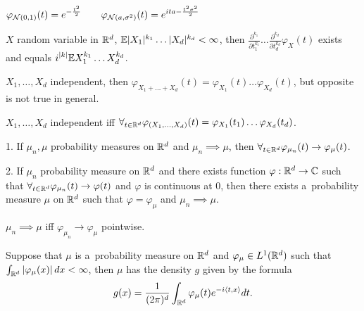 



	\begin{theorem}
		$\displaystyle \varphi_{\mathcal{N}(0,1)}(t) = e^{-\frac{t^2}{2}} \qquad \varphi_{\mathcal{N}(a,\sigma^2)}(t) = e^{ita - \frac{t^2 \sigma^2}{2}}$
	\end{theorem}
	
	\begin{theorem}
		$X$ random variable in $\mathbb{R}^d$, $\mathbb{E} |X_1|^{k_1} \ldots |X_d|^{k_d} < \infty$, then $\displaystyle \frac{\partial^{k_1}}{\partial t_1^{k_1}} \ldots \frac{\partial^{k_d}}{\partial t_d^{k_d}} \varphi_X(t)$ exists and equals $\displaystyle i^{|k|} \mathbb{E} X_1^{k_1} \ldots X_d^{k_d}$.
	\end{theorem}
	
	\begin{remark}
		$X_1, \ldots, X_d$ independent, then $\varphi_{X_1 + \ldots + X_d}(t) = \varphi_{X_1}(t) \ldots \varphi_{X_d}(t)$, but opposite is not true in general.
	\end{remark}
	
	\begin{theorem}
		$X_1, \ldots, X_d$ independent iff $\forall_{t \in \mathbb{R}^d} \varphi_{(X_1, \ldots, X_d)}(t) = \varphi_{X_1}(t_1) \ldots \varphi_{X_d}(t_d)$.
	\end{theorem}
	
	\begin{theorem}[L\'{e}vy-Cramer]
		1. If $\mu_n, \mu$ probability measures on $\mathbb{R}^d$ and $\mu_n \implies \mu$, then $\displaystyle\forall_{t \in \mathbb{R}^d} \varphi_{\mu_n}(t) \to \varphi_\mu(t)$.
		
		2. If $\mu_n$ probability measure on $\mathbb{R}^d$ and there exists function $\varphi:\mathbb{R}^d \to {\mathbb{C}}$ such that $\forall_{t \in \mathbb{R}^d} \varphi_{\mu_n}(t) \to \varphi(t)$ and $\varphi$ is continuous at 0, then there exists a~probability measure $\mu$ on $\mathbb{R}^d$ such that $\varphi=\varphi_\mu$ and $\mu_n \implies \mu$.
	\end{theorem}
	
	\begin{corollary}
		$\mu_n \implies \mu$ iff $\varphi_{\mu_n} \to \varphi_\mu$ pointwise.
	\end{corollary}
	
	\begin{theorem}
		Suppose that $\mu$ is a~probability measure on $\mathbb{R}^d$ and $\varphi_\mu \in L^1(\mathbb{R}^d)$ such that $\int_{\mathbb{R}^d} |\varphi_\mu(x)|\,dx < \infty$, then $\mu$ has the density $g$ given by the formula $$g(x) = \frac{1}{(2 \pi)^d} \int_{\mathbb{R}^d} \varphi_\mu(t) e^{-i\langle t,x\rangle} dt.$$
	\end{theorem}







 
 
